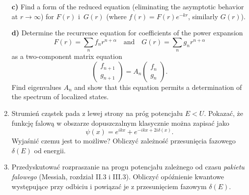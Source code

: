 \documentclass[a4paper,11pt]{article}
\begin{document}
\begin{enumerate}
  \textbf{c)} Find a form of the reduced equation (eliminating the
  asymptotic behavior at $r \to \infty$) for $F( r )$ i~$G( r )$
  (where $f( r ) = F( r ) e^{ -kr }$, similarly $G( r )$).

  \textbf{d)} Determine the recurrence equation for coefficients of
  the power expansion
  \begin{equation}
    \label{QM:24}
    F( r ) = \sum_{ n } f_{ n } r^{ n + \alpha } \quad \textrm{and} \quad
    G( r ) = \sum_{ n } g_{ n } r^{ n + \alpha }
  \end{equation}
  as a two-component matrix equation
  \begin{equation}
    \label{QM:25}
    \begin{pmatrix}
      f_{ n + 1 } \\
      g_{ n + 1 }
    \end{pmatrix}
    =
    A_{ n }
    \begin{pmatrix}
      f_{ n } \\
      g_{ n }
    \end{pmatrix}.
  \end{equation}
  Find eigenvalues $A_{ n }$ and show that this equation permits a
  determination of the spectrum of localized states.

\item Strumień cząstek pada z lewej strony na próg potencjału $E < U$.
  Pokazać, że funkcję falową w obszarze dopuszczalnym klasycznie można
  zapisać jako
  \begin{equation}
    \label{QM:26}
    \psi( x ) = e^{ ikx } + e^{ -ikx + 2 i \delta( x ) }.
  \end{equation}
  Wyjaśnić czemu jest to możliwe? Obliczyć zależność przesunięcia
  fazowego $\delta( E )$ od energii.

\item Przedyskutować rozpraszanie na progu potencjału zależnego od
  czasu \textit{pakietu falowego} (Messiah, rozdział II.3 i III.3).
  Obliczyć opóźnienie kwantowe występujące przy odbiciu i powiązać je
  z przesunięciem fazowym $\delta( E )$.


\end{enumerate}
\end{document}
